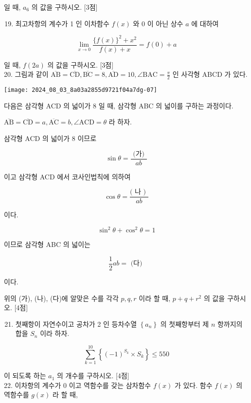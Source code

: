 \documentclass[10pt]{article}
\begin{document}
일 때, \(a_{6}\) 의 값을 구하시오. [3점]

\begin{enumerate}
  \setcounter{enumi}{18}
  \item 최고차항의 계수가 1 인 이차함수 \(f(x)\) 와 0 이 아닌 상수 \(a\) 에 대하여
\end{enumerate}

\[
\lim _{x \rightarrow 0} \frac{\{f(x)\}^{2}+x^{2}}{f(x)+x}=f(0)+a
\]

일 때, \(f(2 a)\) 의 값을 구하시오. [3점]\\
20. 그림과 같이 \(\overline{\mathrm{AB}}=\overline{\mathrm{CD}}, \overline{\mathrm{BC}}=8, \overline{\mathrm{AD}}=10, \angle \mathrm{BAC}=\frac{\pi}{2}\) 인 사각형 ABCD 가 있다.

\begin{center}
\texttt{[image: 2024\_08\_03\_8a03a2855d9721f04a7dg-07]}
\end{center}

다음은 삼각형 ACD 의 넓이가 8 일 때, 삼각형 ABC 의 넓이를 구하는 과정이다.

\(\overline{\mathrm{AB}}=\overline{\mathrm{CD}}=a, \overline{\mathrm{AC}}=b, \angle \mathrm{ACD}=\theta\) 라 하자.

삼각형 ACD 의 넓이가 8 이므로

\[
\sin \theta=\frac{\text { (가) }}{a b}
\]

이고 삼각형 ACD 에서 코사인법칙에 의하여

\[
\cos \theta=\frac{(\text { 나 ) }}{a b}
\]

이다.

\[
\sin ^{2} \theta+\cos ^{2} \theta=1
\]

이므로 삼각형 ABC 의 넓이는

\[
\frac{1}{2} a b=\text { (다) }
\]

이다.

위의 (가), (나), (다)에 알맞은 수를 각각 \(p, q, r\) 이라 할 때, \(p+q+r^{2}\) 의 값을 구하시오. [4점]

\begin{enumerate}
  \setcounter{enumi}{20}
  \item 첫째항이 자연수이고 공차가 2 인 등차수열 \(\left\{a_{n}\right\}\) 의 첫째항부터 제 \(n\) 항까지의 합을 \(S_{n}\) 이라 하자.
\end{enumerate}

\[
\sum_{k=1}^{10}\left\{(-1)^{S_{k}} \times S_{k}\right\} \leq 550
\]

이 되도록 하는 \(a_{1}\) 의 개수를 구하시오. [4점]\\
22. 이차항의 계수가 0 이고 역함수를 갖는 삼차함수 \(f(x)\) 가 있다. 함수 \(f(x)\) 의 역함수를 \(g(x)\) 라 할 때,
\end{document}
